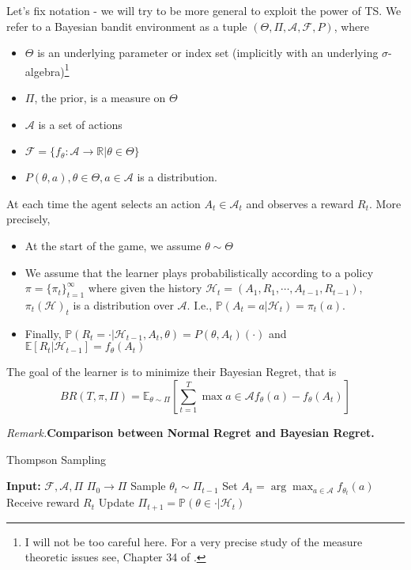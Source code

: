 \documentclass[11pt]{article}
\newcommand{\remark}{\noindent\textit{Remark.}}
\renewcommand{\P}{\mathbb{P}}
\newcommand{\E}{\mathbb{E}}
\newcommand{\mc}[1]{\mathcal{#1}}
\newcommand{\1}[1]{\mathbf{1}\left\{#1\right\}}
\begin{document}
Let's fix notation - we will try to be more general to exploit the power of TS. We refer to a Bayesian bandit environment as a tuple $(\Theta, \Pi, \mc{A}, \mc{F}, P)$, where
\begin{itemize}
    \item $\Theta$ is an underlying parameter or index set (implicitly with an underlying $\sigma$-algebra)\footnote{I will not be too careful here. For a very precise study of the measure theoretic issues see, Chapter 34 of \cite{lattimore2020bandit}.}
    \item $\Pi$, the prior, is a measure on $\Theta$
    \item $\mc{A}$ is a set of actions
    \item $\mc{F}=\{f_{\theta}:\mc{A}\rightarrow \mathbb{R}|\theta\in \Theta\}$
    \item $P(\theta, a), \theta\in \Theta, a\in \mc{A}$ is a distribution.
\end{itemize}

At each time the agent selects an action $A_t\in \mc{A}_t$ and observes a reward $R_t$. More precisely, 
\begin{itemize}
    \item At the start of the game, we assume $\theta\sim \Theta$
    \item We assume that the learner plays probabilistically according to a policy $\pi = \{\pi_t\}_{t=1}^{\infty}$ where given the history $\mc{H}_t = (A_1, R_1, \cdots, A_{t-1}, R_{t-1})$, $\pi_t(\mc{H})_t$ is a distribution over $\mc{A}$. I.e., $\P(A_t = a|\mc{H}_t) = \pi_t(a)$.
    \item Finally, $\P(R_t = \cdot |\mc{H}_{t-1},A_t,\theta) = P(\theta, A_t)(\cdot)$ and $\E[R_t|\mc{H}_{t-1}] = f_{\theta}(A_t)$
\end{itemize}

The goal of the learner is to minimize their Bayesian Regret, that is 
\[BR(T,\pi, \Pi) = \E_{\theta\sim \Pi}[\sum_{t=1}^T \max{a\in \mc{A}} f_{\theta}(a) - f_{\theta}(A_t)] \]



\remark \textbf{Comparison between Normal Regret and Bayesian Regret.}

\begin{algorithm}
\caption{Thompson Sampling}\label{alg:cap}
\begin{algorithmic}
\State \textbf{Input:} $\mc{F}, \mc{A}, \Pi$
\State $\Pi_0 \rightarrow \Pi$
    \State Sample $\theta_t\sim \Pi_{t-1}$
    \State Set $A_t = \arg\max_{a\in \mc{A}} f_{\theta_t}(a)$
    \State Receive reward $R_t$
    \State Update $\Pi_{t+1} = \P(\theta\in \cdot| \mc{H}_{t})$
\EndFor
\end{algorithmic}
\end{algorithm}
\end{document}

